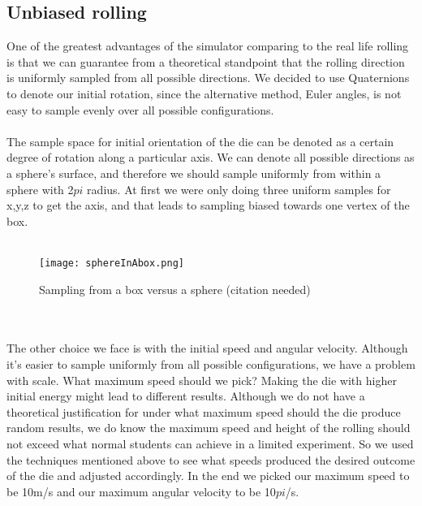 \subsection{Unbiased rolling}
One of the greatest advantages of the simulator comparing to the real life rolling is that we can guarantee from a theoretical standpoint that the rolling direction is uniformly sampled from all possible directions. We decided to use Quaternions to denote our initial rotation, since the alternative method, Euler angles, is not easy to sample evenly over all possible configurations. \\\\
The sample space for initial orientation of the die can be denoted as a certain degree of rotation along a particular axis. We can denote all possible directions as a sphere's surface, and therefore we should sample uniformly from within a sphere with 2${pi}$ radius. At first we were only doing three uniform samples for x,y,z to get the axis, and that leads to sampling biased towards one vertex of the box.\\\\
\begin{figure}[h]
\center
\texttt{[image: sphereInAbox.png]}
\caption{Sampling from a box versus a sphere (citation needed)}
\label{fig:f1}
\end{figure}\\\\
The other choice we face is with the initial speed and angular velocity. Although it's easier to sample uniformly from all possible configurations, we have a problem with scale. What maximum speed should we pick? Making the die with higher initial energy might lead to different results. Although we do not have a theoretical justification for under what maximum speed should the die produce random results, we do know the maximum speed and height of the rolling should not exceed what normal students can achieve in a limited experiment. So we used the techniques mentioned above to see what speeds produced the desired outcome of the die and adjusted accordingly. In the end we picked our maximum speed to be 10m/s and our maximum angular velocity to be 10${pi}$/s.

